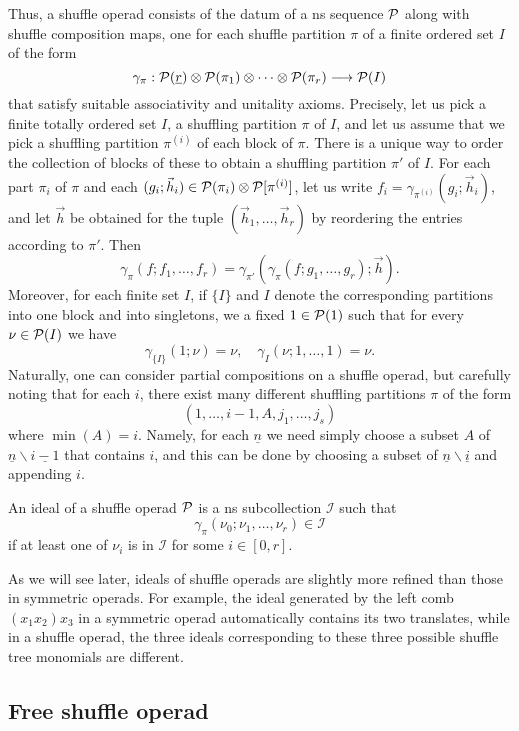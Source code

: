 Thus, a shuffle operad consists of the
datum of a ns sequence ${\mathcal{P}}$ along with
shuffle composition maps, one for each
shuffle partition $\pi$ of a finite ordered
set $I$ of the form
\[
\gamma_\pi : {\mathcal{P}}(\underline{r})\otimes
		{\mathcal{P}}(\pi_1)\otimes\cdots\otimes{\mathcal{P}}(\pi_r)
		 	\longrightarrow {\mathcal{P}}(I)
\]
that satisfy suitable associativity and
unitality axioms. Precisely, let us pick
a finite totally ordered set $I$,
a shuffling partition $\pi$ of $I$,
and let us assume that we pick a shuffling
partition $\pi^{(i)}$ of each block of $\pi$.
There is a unique way to order the collection
of blocks of these to obtain a shuffling
partition $\pi'$ of $I$.
For each part $\pi_i$ of $\pi$
and each $(g_i;\vec{h}_i) \in {\mathcal{P}}(\pi_i)\otimes
{\mathcal{P}}[\pi^{(i)}]$, let us write
$f_i = \gamma_{\pi^{(i)}}(g_i;\vec{h}_i)$,
and let $\vec{h}$ be obtained for the
tuple $(\vec{h}_1,\ldots,\vec{h}_r)$
by reordering the entries according to $\pi'$.
Then
\[ 
\gamma_\pi(f ; f_1,\ldots,f_r) =
 \gamma_{\pi'}(\gamma_\pi(f;g_1,
 \ldots,g_r); \vec{h} ).
	\]
Moreover, for each finite set $I$,
if $\{I\}$ and $I$ denote the corresponding
partitions into one block and into singletons,
we a fixed $1\in {\mathcal{P}}(1)$ such that for
every $\nu\in{\mathcal{P}}(I)$ we have
\[ \gamma_{\{I\}}(1;\nu) = \nu , 
\quad  \gamma_I(\nu ; 1,\ldots,1 ) = 
\nu.\]
Naturally, one can consider partial compositions
on a shuffle operad, but carefully noting that
for each $i$, there exist many different
shuffling partitions $\pi$ of the form
\[
 (1,\ldots,i-1,A,j_1,\ldots,j_s)
 	\]
 where $\min(A) = i$. Namely, for each
 $\underline{n}$ we need simply choose a subset 
 $A$ of $\underline{n}\smallsetminus \underline{i-1}$ that contains
 $i$, and this can be done by choosing a subset
 of $\underline{n}\smallsetminus \underline{i}$ and appending 
 $i$. 
\begin{definition}
An ideal of a shuffle operad ${\mathcal{P}}$ is a
ns subcollection $\mathcal{I}$ such that
\[ \gamma_\pi(\nu_0;\nu_1,\ldots,\nu_r)\in 
\mathcal{I}\] if at least one of $\nu_i$
is in $\mathcal{I}$ for some $i\in [0,r]$.
\end{definition}

As we will see later, ideals of shuffle operads
are slightly more refined than those in
symmetric operads. For example, the ideal 
generated by the left comb $(x_1x_2)x_3$
in a symmetric operad
automatically contains its two translates,
while in a shuffle operad, the three ideals
corresponding to these three possible shuffle
tree monomials are different. 

\subsection{Free shuffle operad}

